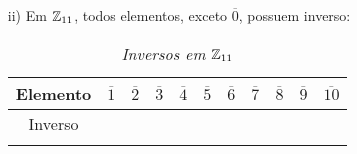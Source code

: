 \documentclass{beamer}
\begin{document}
    \begin{frame}
        \begin{exemplos}
            \begin{enumerate}
                \item[ii)] Em $\mathbb{Z}_{11}$, \pause todos elementos, exceto $\overline{0}$, \pause possuem inverso:
                \begin{table}[h]
                    \caption{\it Inversos em $\mathbb{Z}_{11}$}
                   \begin{tabular}{|c|c|c|c|c|c|c|c|c|c|c|} 
                        \hline
                        Elemento & $\overline{1}$ & $\overline{2}$ & $\overline{3}$ & $\overline{4}$ & $\overline{5}$ & $\overline{6}$ & $\overline{7}$ & $\overline{8}$ & $\overline{9}$ & $\overline{10}$\T \\
                        \hline
                        Inverso & \phantom{ab} & \phantom{ab} & \phantom{ab} & \phantom{ab} & \phantom{ab} & \phantom{ab} & \phantom{ab} & \phantom{ab} & \phantom{ab} & \phantom{ab} \T\\
                        & & & & & & & & & & \\
                        \hline
                   \end{tabular}
                \end{table}
            \end{enumerate}
            \vspace{3.5cm}
        \end{exemplos}
    \end{frame}
\end{document}
